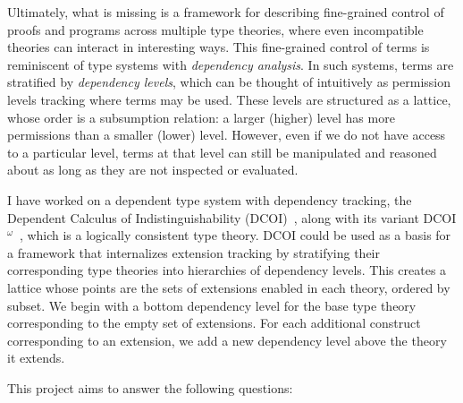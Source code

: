 \documentclass{article}
\begin{document}
Ultimately, what is missing is a framework for describing
fine-grained control of proofs and programs across multiple type theories,
where even incompatible theories can interact in interesting ways.
This fine-grained control of terms is reminiscent of
type systems with \emph{dependency analysis}.
In such systems, terms are stratified by \emph{dependency levels},
which can be thought of intuitively as permission levels tracking where terms may be used.
These levels are structured as a lattice,
whose order is a subsumption relation:
a larger (higher) level has more permissions than a smaller (lower) level.
However, even if we do not have access to a particular  level,
terms at that level can still be manipulated and reasoned about
as long as they are not inspected or evaluated.

I have worked on a dependent type system with dependency tracking,
the Dependent Calculus of Indistinguishability (DCOI)~\citep{dcoi},
along with its variant DCOI$^\omega$~\citep{dcoi-omega},
which is a logically consistent type theory.
DCOI could be used as a basis for a framework
that internalizes extension tracking by stratifying
their corresponding type theories into hierarchies of dependency levels.
This creates a lattice whose points are the sets of extensions
enabled in each theory, ordered by subset.
We begin with a bottom dependency level for the base type theory
corresponding to the empty set of extensions.
For each additional construct corresponding to an extension,
we add a new dependency level above the theory it extends.

This project aims to answer the following questions:

\end{document}

